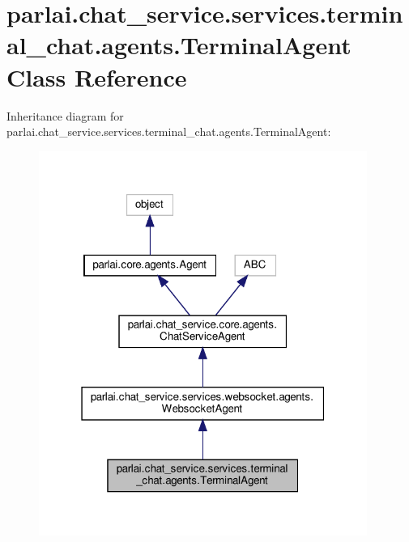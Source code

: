 \hypertarget{classparlai_1_1chat__service_1_1services_1_1terminal__chat_1_1agents_1_1TerminalAgent}{}\section{parlai.\+chat\+\_\+service.\+services.\+terminal\+\_\+chat.\+agents.\+Terminal\+Agent Class Reference}
\label{classparlai_1_1chat__service_1_1services_1_1terminal__chat_1_1agents_1_1TerminalAgent}


Inheritance diagram for parlai.\+chat\+\_\+service.\+services.\+terminal\+\_\+chat.\+agents.\+Terminal\+Agent\+:
\nopagebreak
\begin{figure}[H]
\begin{center}
\leavevmode
\includegraphics[width=304pt]{d8/d30/classparlai_1_1chat__service_1_1services_1_1terminal__chat_1_1agents_1_1TerminalAgent__inherit__graph}
\end{center}
\end{figure}


